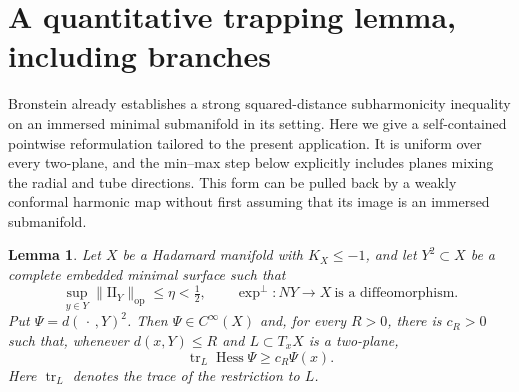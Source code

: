 \documentclass[12pt]{amsart}
\newtheorem{lemma}[theorem]{Lemma}
\theoremstyle{remark}
\newcommand{\tr}{\operatorname{tr}}
\newcommand{\Hess}{\operatorname{Hess}}
\newcommand{\II}{\mathrm{II}}
\begin{document}
\section{A quantitative trapping lemma, including branches}

Bronstein \cite[Proposition~4.5]{BronsteinHadamard} already establishes a
strong squared-distance subharmonicity inequality on an immersed minimal
submanifold in its setting.  Here we give a self-contained pointwise
reformulation tailored to the present application.  It is uniform over every
two-plane, and the min--max
step below explicitly includes planes mixing the radial and tube directions.
This form can be pulled back by a weakly conformal harmonic map without first
assuming that its image is an immersed submanifold.  

\begin{lemma}\label{lem:tube}
Let $X$ be a Hadamard manifold with $K_X\le-1$, and let
$Y^2\subset X$ be a complete embedded minimal surface such that
\[
 \sup_{y\in Y}\|\II_Y\|_{\mathrm{op}}\le\eta<\tfrac12,
 \qquad
 \exp^\perp:NY\longrightarrow X\ \text{is a diffeomorphism}.
\]
Put $\Psi=d(\,\cdot\,,Y)^2$.  Then $\Psi\in C^\infty(X)$ and, for every
$R>0$, there is $c_R>0$ such that, whenever $d(x,Y)\le R$ and
$L\subset T_xX$ is a two-plane,
\begin{equation}\label{eq:tube-estimate}
 \tr_L\Hess\Psi\ge c_R\Psi(x).
\end{equation}
Here $\tr_L$ denotes the trace of the restriction to $L$.
\end{lemma}
\end{document}
